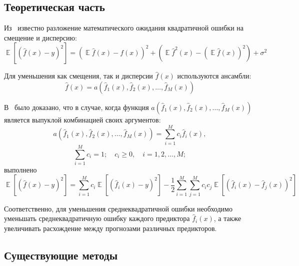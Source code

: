 \documentclass[12pt, fleqn]{article}
\newcommand{\expectation}{\mathop{\mathbb{E}}}
\newcommand{\predictionfunction}{\hat{f}}
\newcommand{\ensemblefunction}{a}
\newcommand{\numberpredictionfunctions}{M}
\newcommand{\for}[3]{\sum\limits_{#1 = #2}^{#3}}  %
\newcommand{\forn}[2]{\for{#1}{1}{#2}}  %
\newcommand{\many}[3]{#1 1 #2, #1 2 #2, \dots, #1 #3 #2}  %
\newcommand{\ensemblefunctionfull}{\ensemblefunction(\many{\predictionfunction_}{(x)}{\numberpredictionfunctions})}
\begin{document}
\subsection{Теоретическая часть}
Из~\cite{BiasVarianceDecompositionZeroOneSquaredLoss} известно разложение математического ожидания квадратичной ошибки на смещение и дисперсию:
\begin{equation*}
\expectation \left[ \left( \predictionfunction(x) - y \right)^2 \right] =
\left(
	\expectation \predictionfunction(x) - f(x)
\right)^2  +
\left(
	\expectation \predictionfunction^2(x) - \left(\expectation \predictionfunction(x)\right)^2
\right) + \sigma^2
\end{equation*}

Для уменьшения как смещения, так и дисперсии $\predictionfunction(x)$ используются ансамбли:
\begin{equation*}
\predictionfunction(x) = \ensemblefunctionfull
\end{equation*}

В~\cite{OptimalConvexCorrectingProcedures} было доказано, что в случае, когда функция $\ensemblefunctionfull$ является выпуклой комбинацией своих аргументов:
\begin{equation*}
\ensemblefunctionfull = 
\forn{i}{\numberpredictionfunctions} c_i \predictionfunction_i(x),
\end{equation*}
\begin{equation*}
\forn{i}{\numberpredictionfunctions} c_i = 1; \quad c_i \geq 0, \quad i = \many{}{}{\numberpredictionfunctions};
\end{equation*}
выполнено
\begin{equation}\label{OptimizedDifferenceDecomposition}
\expectation \left[\left( \predictionfunction(x) - y \right)^2 \right] =
\forn{i}{\numberpredictionfunctions} c_i
\expectation \left[ \left(
	\predictionfunction_i(x) - y
\right)^2 \right] 
- \dfrac{1}{2}
\forn{i}{\numberpredictionfunctions} \forn{j}{\numberpredictionfunctions} c_i c_j
\expectation \left[ \left(
	\predictionfunction_i(x) - \predictionfunction_j(x)
\right)^2 \right]
\end{equation}

Соответственно, для уменьшения среднеквадратичной ошибки необходимо уменьшать среднеквадратичную ошибку каждого предиктора $\predictionfunction_i(x)$, а также увеличивать расхождение между прогнозами различных предикторов.

\subsection{Существующие методы}
\end{document}
